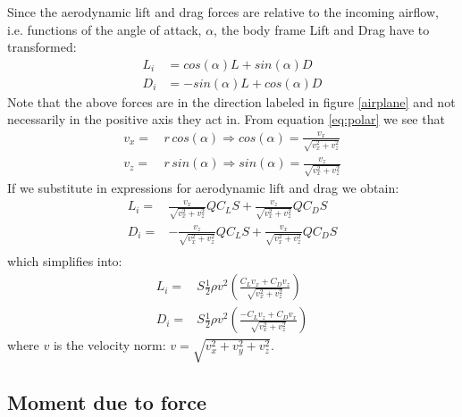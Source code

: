 Since the aerodynamic lift and drag forces are relative to the incoming airflow, i.e. functions of the angle of attack, $\alpha$, the body frame Lift and Drag have to transformed:
\begin{equation}\begin{split}
    L_i &= cos(\alpha) L + sin(\alpha) D \\
    D_i &= -sin(\alpha) L + cos(\alpha) D
    \label{LDbodyframe}
\end{split}\end{equation}
Note that the above forces are in the direction labeled in figure \ref{airplane} and not necessarily in the positive axis they act in.
From equation \ref{eq:polar} we see that
\begin{equation}\begin{split}
    v_x =& \, r \, cos(\alpha) \Rightarrow cos(\alpha) = \frac{v_x}{\sqrt{v_x^2 + v_z^2}} \\
    v_z =& \, r \, sin(\alpha) \Rightarrow sin(\alpha) = \frac{v_z}{\sqrt{v_x^2 + v_z^2}}
\end{split}\end{equation}
If we substitute in expressions for aerodynamic lift and drag we obtain:
\begin{equation}\begin{split}
    L_i =&  \frac{v_x}{\sqrt{v_x^2 + v_z^2}} Q C_L S +
            \frac{v_z}{\sqrt{v_x^2 + v_z^2}} Q C_D S \\
    D_i =& -\frac{v_z}{\sqrt{v_x^2 + v_z^2}} Q C_L S +
            \frac{v_x}{\sqrt{v_x^2 + v_z^2}} Q C_D S \\          
\end{split}\end{equation}
which simplifies into:
\begin{equation}\begin{split}
    L_i =& 
     S \frac{1}{2} \rho v^2 \left( \frac{C_L v_x + C_D v_z}{\sqrt{v_x^2 + v_z^2}} \right) \\
    D_i =& 
     S \frac{1}{2} \rho v^2 \left( \frac{-C_L v_z + C_D v_x}{\sqrt{v_x^2 + v_z^2}} \right)
     \label{liftdragbody}
\end{split}\end{equation}
where $v$ is the velocity norm: $v = \sqrt{v_x^2 + v_y^2 + v_z^2}$.


\subsection{Moment due to force}

